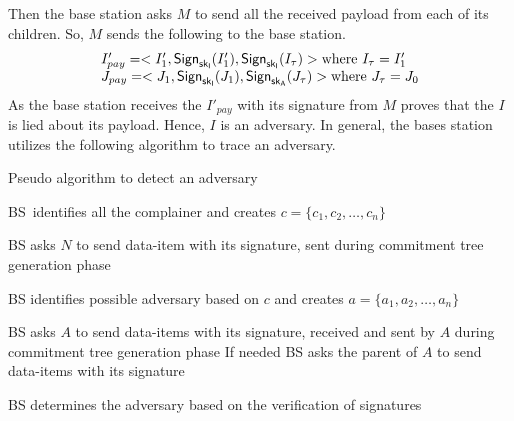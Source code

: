 		Then the base station asks $M$ to send all the received payload from each of its children.
		So, $M$ sends the following to the base station.
		\begin{equation*}
			\begin{array}{l}
				I'_{pay} = <I'_{1}, \textsf{Sign}_{\sf{sk}_{I}}(I'_{1}), \textsf{Sign}_{\sf{sk}_{I}}(I_{\tau})> \mbox{where}\ I_{\tau} = I'_{1}\\
				J_{pay} = <J_{1}, \textsf{Sign}_{\sf{sk}_{I}}(J_{1}), \textsf{Sign}_{\sf{sk}_{A}}(J_{\tau})> \mbox{where}\ J_{\tau} = J_{0}\\
			\end{array}
		\end{equation*}
		As the base station receives the $I'_{pay}$ with its signature from $M$ proves that the $I$ is lied about its payload.
		Hence, $I$ is an adversary.
		In general, the bases station utilizes the following algorithm to trace an adversary.
		\begin{algorithm}
			\caption{Pseudo algorithm to detect an adversary}
			\label{algo:detect-an-adversary}
			\begin{algorithmic}[1]

				\STATE BS\ identifies all the complainer and creates $c = \{c_{1}, c_{2}, \dotsc, c_{n}\}$

					\STATE BS asks $N$ to send data-item with its signature, sent during commitment tree generation phase
				
				\ENDFOR

				\STATE BS identifies possible adversary based on $c$ and creates $a = \{a_{1},a_{2},\dotsc,a_{n}\}$


					\STATE BS asks $A$ to send data-items with its signature, received and sent by $A$ during commitment tree generation phase
					\STATE If needed BS  asks the parent of $A$ to send data-items with its signature
		
				\ENDFOR

				\STATE BS determines the adversary based on the verification of signatures

			\end{algorithmic}
		\end{algorithm}

